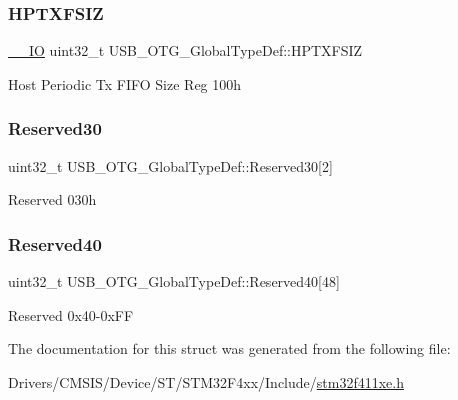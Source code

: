 \subsubsection{\texorpdfstring{H\+P\+T\+X\+F\+S\+IZ}{HPTXFSIZ}}
{\footnotesize\ttfamily \hyperlink{core__sc300_8h_aec43007d9998a0a0e01faede4133d6be}{\+\_\+\+\_\+\+IO} uint32\+\_\+t U\+S\+B\+\_\+\+O\+T\+G\+\_\+\+Global\+Type\+Def\+::\+H\+P\+T\+X\+F\+S\+IZ}

Host Periodic Tx F\+I\+FO Size Reg 100h \mbox{\label{struct_u_s_b___o_t_g___global_type_def_a978a73c27d2afe65def81f28b881e138}} 
\subsubsection{\texorpdfstring{Reserved30}{Reserved30}}
{\footnotesize\ttfamily uint32\+\_\+t U\+S\+B\+\_\+\+O\+T\+G\+\_\+\+Global\+Type\+Def\+::\+Reserved30\mbox{[}2\mbox{]}}

Reserved 030h \mbox{\label{struct_u_s_b___o_t_g___global_type_def_ab32b3885e27effc89f6ffe83d46ddd8e}} 
\subsubsection{\texorpdfstring{Reserved40}{Reserved40}}
{\footnotesize\ttfamily uint32\+\_\+t U\+S\+B\+\_\+\+O\+T\+G\+\_\+\+Global\+Type\+Def\+::\+Reserved40\mbox{[}48\mbox{]}}

Reserved 0x40-\/0x\+FF 

The documentation for this struct was generated from the following file\+:\begin{DoxyCompactItemize}
\item 
Drivers/\+C\+M\+S\+I\+S/\+Device/\+S\+T/\+S\+T\+M32\+F4xx/\+Include/\hyperlink{stm32f411xe_8h}{stm32f411xe.\+h}\end{DoxyCompactItemize}
